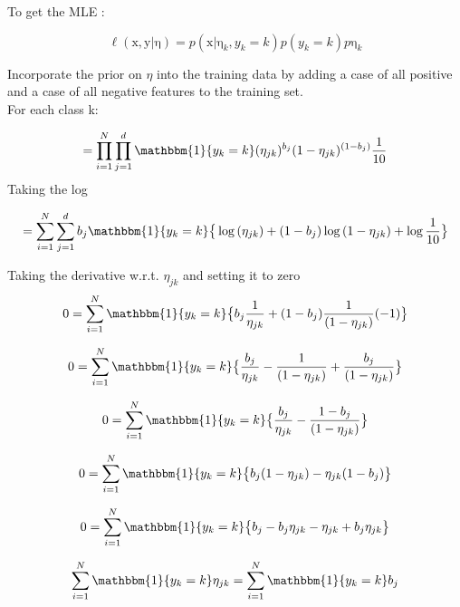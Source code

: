 \documentclass[12pt,letterpaper]{article} %
\newcommand{\bs}[1]{\bm{\mathrm{#1}}} %
\newcommand{\switch}[0]{\mathbbm{1}\{y_k=k\}}
\begin{document}
  \addtocounter{subsubsection}{1}
 \subsubsection{}
 To get the MLE :
 
 \begin{equation*}
  \ell(\bs{x},\bs{y} | \bs{\eta}) = p(\bs{x} | \bs{\eta}_k, y_k=k)p(y_k = k)p{\bs{\eta}_k}
 \end{equation*}

Incorporate the prior on  $\eta$ into the training data by adding a case of all positive and a case of all negative features to the training set.\\
For each class k: 

 \begin{equation*}
 =\prod^N_{i=1}\prod^d_{j=1}\switch(\eta_{jk})^{b_j}(1-\eta_{jk})^{(1-{b_j})}\frac{1}{10}
 \end{equation*}
Taking the log 


 \begin{equation*}
 =\sum^N_{i=1}\sum^d_{j=1}{b_j}\switch\big\{\log{(\eta_{jk})}+ (1-{b_j})\log{(1-\eta_{jk})} + \log{\frac{1}{10}}\big\}
 \end{equation*}

Taking the derivative w.r.t. $\eta_{jk}$ and setting it to zero
\begin{equation*}
0 = \sum^N_{i=1}\switch\big\{b_j\frac{1}{\eta_{jk}} + (1-{b_j})\frac{1}{(1-\eta_{jk})}(-1)\big\}
\end{equation*}

\begin{equation*}
0 = \sum^N_{i=1}\switch\big\{\frac{b_j}{\eta_{jk}} -\frac{1}{(1-\eta_{jk})} +  \frac{b_j}{(1-\eta_{jk})}\big\}
\end{equation*}

\begin{equation*}
0 = \sum^N_{i=1}\switch\big\{\frac{b_j}{\eta_{jk}} -\frac{1- b_j}{(1-\eta_{jk})}\big\}
\end{equation*}

\begin{equation*}
0 = \sum^N_{i=1}\switch\big\{{b_j}(1-\eta_{jk}) - \eta_{jk}(1-b_j)\big\}
\end{equation*}

\begin{equation*}
0 = \sum^N_{i=1}\switch\big\{b_j-b_j\eta_{jk} - \eta_{jk} + b_j\eta_{jk}\big\}
\end{equation*}

\begin{equation*}
\sum^N_{i=1}\switch\eta_{jk} = \sum^N_{i=1}\switch{}b_j
\end{equation*}
\end{document}
